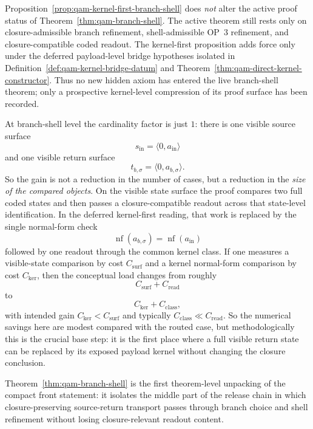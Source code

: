 \begin{remark}\label{rem:qam-kernel-first-branch-shell-audit}
Proposition~\ref{prop:qam-kernel-first-branch-shell} does \emph{not} alter the active proof status of Theorem~\ref{thm:qam-branch-shell}. The active theorem still rests only on closure-admissible branch refinement, shell-admissible OP~3 refinement, and closure-compatible coded readout. The kernel-first proposition adds force only under the deferred payload-level bridge hypotheses isolated in Definition~\ref{def:qam-kernel-bridge-datum} and Theorem~\ref{thm:qam-direct-kernel-constructor}. Thus no new hidden axiom has entered the live branch-shell theorem; only a prospective kernel-level compression of its proof surface has been recorded.
\end{remark}

\begin{remark}\label{rem:qam-kernel-first-branch-shell-savings}
At branch-shell level the cardinality factor is just $1$: there is one visible source surface
\[
s_{\mathrm{in}}=\langle 0,a_{\mathrm{in}}\rangle
\]
and one visible return surface
\[
t_{b,\sigma}=\langle 0,a_{b,\sigma}\rangle.
\]
So the gain is not a reduction in the number of cases, but a reduction in the \emph{size of the compared objects}. On the visible state surface the proof compares two full coded states and then passes a closure-compatible readout across that state-level identification. In the deferred kernel-first reading, that work is replaced by the single normal-form check
\[
\operatorname{nf}(a_{b,\sigma})=\operatorname{nf}(a_{\mathrm{in}})
\]
followed by one readout through the common kernel class. If one measures a visible-state comparison by cost $C_{\mathrm{surf}}$ and a kernel normal-form comparison by cost $C_{\mathrm{ker}}$, then the conceptual load changes from roughly
\[
C_{\mathrm{surf}} + C_{\mathrm{read}}
\]
to
\[
C_{\mathrm{ker}} + C_{\mathrm{class}},
\]
with intended gain $C_{\mathrm{ker}}<C_{\mathrm{surf}}$ and typically $C_{\mathrm{class}}\ll C_{\mathrm{read}}$. So the numerical savings here are modest compared with the routed case, but methodologically this is the crucial base step: it is the first place where a full visible return state can be replaced by its exposed payload kernel without changing the closure conclusion.
\end{remark}

\begin{remark}
Theorem~\ref{thm:qam-branch-shell} is the first theorem-level unpacking of the compact front statement: it isolates the middle part of the release chain in which closure-preserving source-return transport passes through branch choice and shell refinement without losing closure-relevant readout content.
\end{remark}

